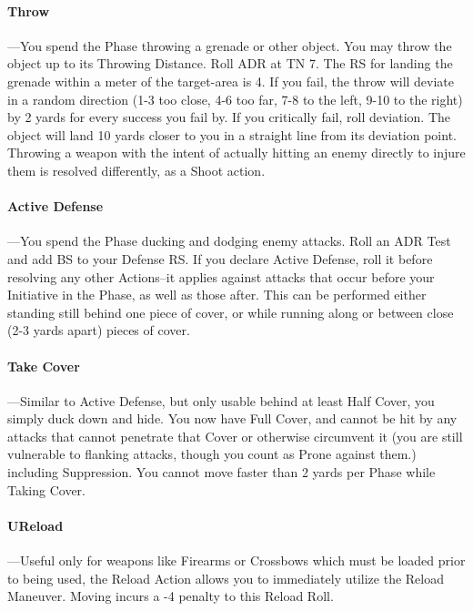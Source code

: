 \documentclass[oneside,11pt,english]{book}
\begin{document}
\paragraph{Throw}---\quad You spend the Phase throwing a grenade or other object. You may throw the object up to its
Throwing Distance. Roll ADR at TN 7. The RS for landing the grenade within a meter of the target-area
is 4. If you fail, the throw will deviate in a random direction (1-3 too close, 4-6 too far, 7-8 to the left,
9-10 to the right) by 2 yards for every success you fail by. If you critically fail, roll deviation. The object
will land 10 yards closer to you in a straight line from its deviation point.
Throwing a weapon with the intent of actually hitting an enemy directly to injure them is resolved
differently, as a Shoot action.

\paragraph{\label{par:Active Defense:} Active Defense}---\quad You spend the Phase ducking and dodging enemy attacks. Roll an ADR Test and add BS
to your Defense RS. If you declare Active Defense, roll it before resolving any other Actions--it applies
against attacks that occur before your Initiative in the Phase, as well as those after. This can be performed
either standing still behind one piece of cover, or while running along or between close (2-3 yards apart)
pieces of cover.

\paragraph{\label{par:Take Cover} Take Cover}---\quad Similar to Active Defense, but only usable behind at least Half Cover, you simply duck down and hide. You now have Full Cover, and cannot be hit by any attacks that cannot penetrate that
Cover or otherwise circumvent it (you are still vulnerable to flanking attacks, though you count as Prone
against them.) including Suppression. You cannot move faster than 2 yards per Phase while Taking
Cover.

\paragraph{\label{par:Reload}UReload}---\quad Useful only for weapons like Firearms or Crossbows which must be loaded prior to being used,
the Reload Action allows you to immediately utilize the Reload Maneuver. Moving incurs a -4 penalty to
this Reload Roll.
\end{document}
